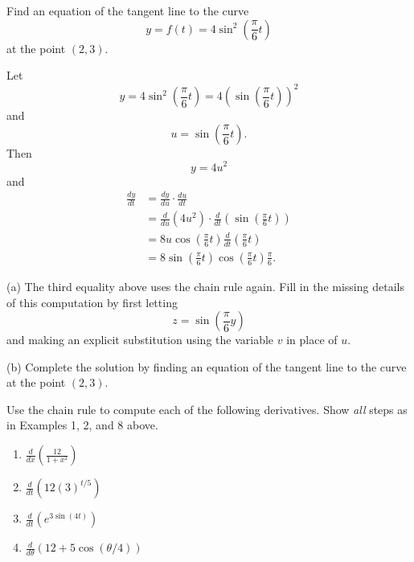 \documentclass{ximera}
\begin{document}
\begin{example}  \label{Ex:df4thghg}
Find an equation of the tangent line to the curve
\[
  y = f(t) = 4 \sin^2 \left( \frac{\pi}{6}t \right)
\]
at the point $(2,3)$.

\begin{explanation}
Let 
\[
       y = 4 \sin^2 \left( \frac{\pi}{6}t \right) =  4 \left( \sin \left( \frac{\pi}{6}t \right)\right)^2
\]
and 
\[
      u = \sin\left( \frac{\pi}{6}t \right) .
\]
Then
\[
     y =4 u^2
\]
and
\begin{align*}
\frac{dy}{dt} &= \frac{dy}{du} \cdot \frac{du}{dt}  \\
                     &= \frac{d}{du} \left( 4u^2 \right)  \cdot \frac{d}{dt}\left(  \sin\left( \frac{\pi}{6}t \right)  \right)  \\
                     &= 8u   \cos \left(   \frac{\pi}{6}t  \right) \frac{d}{dt} \left( \frac{\pi}{6}t  \right)     \\
                     &= 8\sin\left( \frac{\pi}{6}t \right)  \cos \left(   \frac{\pi}{6}t  \right) \frac{\pi}{6} .
\end{align*}

\begin{question}  \label{Q:dsf4tt}
(a) The third equality above uses the chain rule again. Fill in the missing details of this computation by first letting
\[
    z = \sin \left(  \frac{\pi}{6}y \right)
\]
and making an explicit substitution using the variable $v$ in place of $u$.

(b) Complete the solution by finding an equation of the tangent line to the curve at the point $(2,3)$. 
\end{question}
\end{explanation}
\end{example}


\begin{question} \label{Q:ds99fgg0sdf}
Use the chain rule to compute each of the following derivatives. Show \emph{all} steps as in Examples 1, 2, and 8 above.
\begin{enumerate}
\item $\frac{d}{dx} \left(  \frac{12}{1+x^2} \right)$

\item $\frac{d}{dt} \left( 12 (3)^{t/5}   \right)$

\item $\frac{d}{dt} \left(  e^{3 \sin (4t)} \right)$

\item $\frac{d}{d\theta} \left( 12 + 5 \cos (\theta/4)   \right)$
\end{enumerate}
\end{question}
\end{document}

